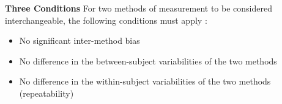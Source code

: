 \documentclass[compress]{beamer}        %
\makeatletter
\newcommand{\tcb}{\textcolor{beamer@blendedblue}}
\makeatother
\begin{document}
\begin{frame}{\bf \tcb{Three Conditions}}
For two methods of measurement to be considered interchangeable, the following conditions must apply \cite{Roy2009}:
\\
\begin{itemize}\itemsep0.5cm
\item No significant inter-method bias
\item No difference in the between-subject variabilities of the two methods
\item No difference in the within-subject variabilities of the two methods (repeatability)
\end{itemize}
\end{frame}



\end{document}
